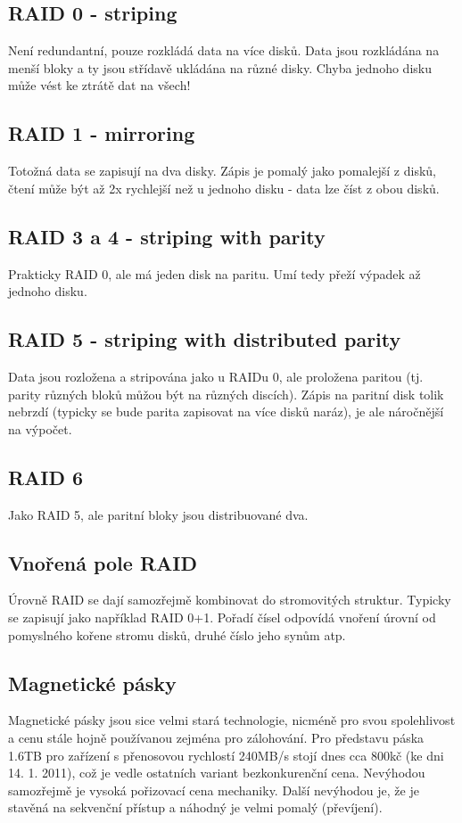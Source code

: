 \documentclass[a4paper,12pt]{article}
\begin{document}
\subsection{RAID 0 - striping}
\setcounter{equation}{0}
Není redundantní, pouze rozkládá data na více disků. Data jsou rozkládána na 
menší bloky a ty jsou střídavě ukládána na různé disky. Chyba jednoho disku může 
vést ke ztrátě dat na všech!

\subsection{RAID 1 - mirroring}
\setcounter{equation}{0}
Totožná data se zapisují na dva disky. Zápis je pomalý jako pomalejší z disků, 
čtení může být až 2x rychlejší než u jednoho disku - data lze číst z obou disků.

\subsection{RAID 3 a 4 - striping with parity}
\setcounter{equation}{0}
Prakticky RAID 0, ale má jeden disk na paritu. Umí tedy přeží výpadek až jednoho 
disku.

\subsection{RAID 5 - striping with distributed parity}
\setcounter{equation}{0}
Data jsou rozložena a stripována jako u RAIDu 0, ale proložena paritou (tj.  
parity různých bloků můžou být na různých discích). Zápis na paritní disk tolik 
nebrzdí (typicky se bude parita zapisovat na více disků naráz), je ale 
náročnější na výpočet.

\subsection{RAID 6}
\setcounter{equation}{0}
Jako RAID 5, ale paritní bloky jsou distribuované dva.

\subsection{Vnořená pole RAID}
\setcounter{equation}{0}
Úrovně RAID se dají samozřejmě kombinovat do stromovitých struktur. Typicky se 
zapisují jako například RAID 0+1. Pořadí čísel odpovídá vnoření úrovní od 
pomyslného kořene stromu disků, druhé číslo jeho synům atp.


\subsection{Magnetické pásky}
\setcounter{equation}{0}
Magnetické pásky jsou sice velmi stará technologie, nicméně pro svou 
spolehlivost a cenu stále hojně používanou zejména pro zálohování. Pro představu 
páska 1.6TB pro zařízení s přenosovou rychlostí 240MB/s stojí dnes cca 800kč (ke 
dni 14. 1. 2011), což je vedle ostatních variant bezkonkurenční cena. Nevýhodou 
samozřejmě je vysoká pořizovací cena mechaniky. Další nevýhodou je, že je 
stavěná na sekvenční přístup a náhodný je velmi pomalý (převíjení).
\end{document}
